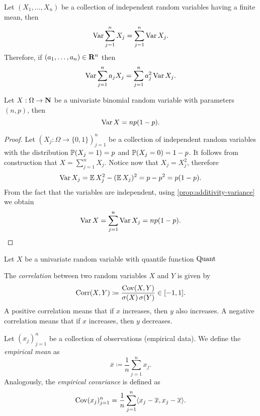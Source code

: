 \begin{proposition}
\label{prop:additivity-variance}
Let \((X_1, \dots, X_n)\) be a collection of independent random variables having
a finite mean, then
\[
\operatorname{Var} \sum_{j=1}^n X_j = \sum_{j=1}^n \operatorname{Var} X_j.
\]
Therefore, if \((a_1, \dots, a_n) \in \mathbf{R}^n\) then
\[
\operatorname{Var} \sum_{j=1}^n a_j X_j = \sum_{j=1}^n a_j^2 \operatorname{Var} X_j.
\]
\end{proposition}

\begin{proposition}
\label{prop:variance-binomial-random-variable}
Let \(X: \Omega \to \mathbf{N}\) be a univariate binomial random variable with parameters
\((n, p)\), then
\[
\operatorname{Var} X = n p (1 - p).
\]
\end{proposition}

\begin{proof}
Let \((X_j: \Omega \to \{0, 1\})_{j=1}^n\) be a collection of independent random
variables with the distribution \(\operatorname{\mathbb{P}}(X_j = 1) = p\) and
\(\operatorname{\mathbb{P}}(X_j = 0) = 1 - p\). It follows from construction that \(X = \sum_{j=1}^n
X_j\). Notice now that \(X_j = X_j^2\), therefore
\[
\operatorname{Var} X_j = \operatorname{\mathbb{E}} X_j^2 - (\operatorname{\mathbb{E}} X_j)^2 = p - p^2 = p(1 - p).
\]
From the fact that the variables are independent, using
\cref{prop:additivity-variance} we obtain
\[
\operatorname{Var} X = \sum_{j=1}^n \operatorname{Var} X_j = n p (1 - p).
\]
\end{proof}

\begin{definition}
\label{def:interquartile-range}
Let \(X\) be a univariate random variable with quantile function \(\operatorname{Quant}\)
\end{definition}

\begin{definition}[Correlation]
\label{def:correlation}
The \emph{correlation} between two random variables \(X\) and \(Y\) is given by
\[
\operatorname{Corr}(X, Y) \coloneq \frac{\operatorname{Cov}(X, Y)}{\operatorname{\sigma}(X) \operatorname{\sigma}(Y)} \in [-1, 1].
\]
A positive correlation means that if \(x\) increases, then \(y\) also
increases. A negative correlation means that if \(x\) increases, then \(y\)
decreases.
\end{definition}

\begin{definition}
\label{def:empirical-mean-and-covariance}
Let \((x_j)_{j=1}^{n}\) be a collection of observations (empirical data). We
define the \emph{empirical mean} as
\[
\overline x \coloneq \frac{1}{n} \sum_{j=1}^n x_j.
\]
Analogously, the \emph{empirical covariance} is defined as
\[
\operatorname{Cov}(x_j)_{j=1}^n
= \frac{1}{n} \sum_{j=1}^n \langle x_j - \overline x, x_j - \overline x \rangle.
\]
\end{definition}

